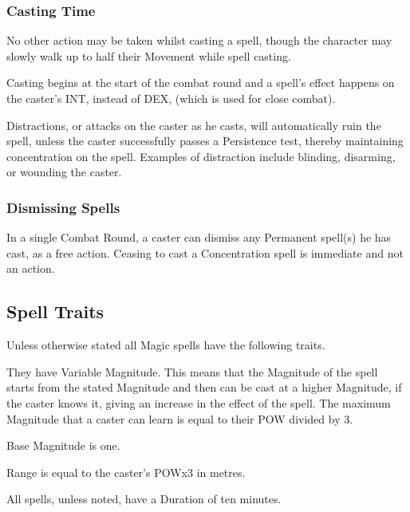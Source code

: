 \subsubsection{Casting Time}
No other action may be taken whilst casting a spell, though the character may slowly walk up to half their Movement while spell casting. %

Casting begins at the start of the combat round and a spell’s effect happens on the caster’s INT, instead of DEX, (which is used for close combat).  

Distractions, or attacks on the caster as he casts, will automatically ruin the spell, unless the caster successfully passes a Persistence test, thereby maintaining concentration on the spell. Examples of distraction include blinding, disarming, or wounding the caster.

\subsubsection{Dismissing Spells}
In a single Combat Round, a caster can dismiss any Permanent spell(s) he has cast, as a free action. Ceasing to cast a Concentration spell is immediate and not an action. 


\subsection{Spell Traits}
Unless otherwise stated all Magic spells have the following traits.

\begin{rpg-list}
\item They have Variable Magnitude. This means that the Magnitude of the spell starts from the stated Magnitude and then can be cast at a higher Magnitude, if the caster knows it, giving an increase in the effect of the spell. The maximum Magnitude that a caster can learn is equal to their POW divided by 3.
\item Base Magnitude is one. 
\item Range is equal to the caster’s POWx3 in metres.
\item All spells, unless noted, have a Duration of ten minutes.
\end{rpg-list}

